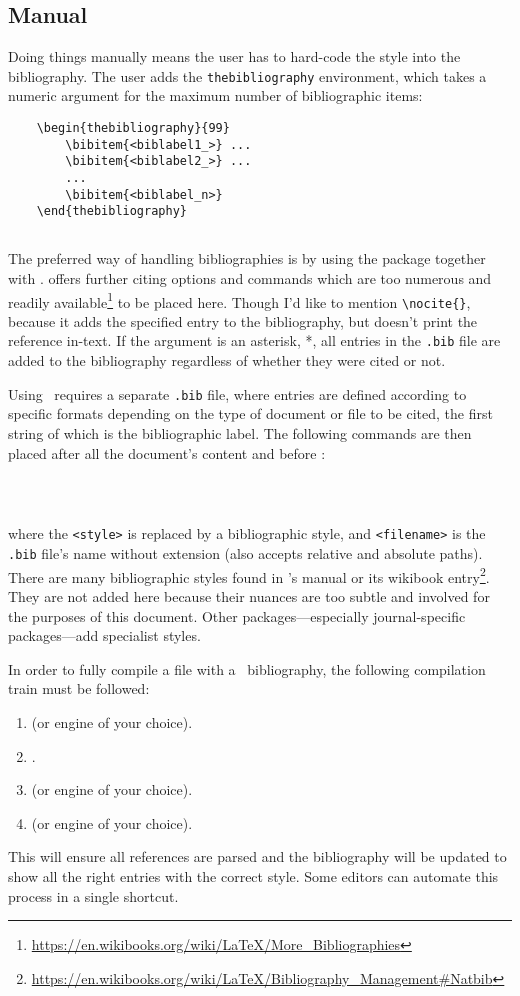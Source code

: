 \subsection{Manual}
%
Doing things manually means the user has to hard-code the style into
the bibliography.  The user adds the \verb|thebibliography|
environment, which takes a numeric argument for the maximum number of
bibliographic items:
\begin{verbatim}
	\begin{thebibliography}{99}
	    \bibitem{<biblabel1_>} ...
	    \bibitem{<biblabel2_>} ...
	    ...
	    \bibitem{<biblabel_n>}
	\end{thebibliography}
\end{verbatim}
%
\subsection{\BibTeX}\label{sb:bib}
%
The preferred way of handling bibliographies is by using the
 package together with \BibTeX.   offers
further citing options and commands which are too numerous and readily
available\footnote{\url{https://en.wikibooks.org/wiki/LaTeX/More_Bibliographies}}
to be placed here.  Though I'd like to mention \verb|\nocite{}|,
because it adds the specified entry to the bibliography, but doesn't
print the reference in-text.  If the argument is an asterisk, *, all
entries in the \verb|.bib| file are added to the bibliography
regardless of whether they were cited or not.

Using \BibTeX~requires a separate \verb|.bib| file, where entries are
defined according to specific formats depending on the type of
document or file to be cited, the first string of which is the
bibliographic label.  The following commands are then placed after all
the document's content and before \verb||:
\begin{verbatim}
	
	
\end{verbatim}
where the \verb|<style>| is replaced by a bibliographic style, and
\verb|<filename>| is the \verb|.bib| file's name without extension
(also accepts relative and absolute paths).  There are many
bibliographic styles found in 's manual or its wikibook
entry\footnote{\url{https://en.wikibooks.org/wiki/LaTeX/Bibliography_Management\#Natbib}}. They
are not added here because their nuances are too subtle and involved
for the purposes of this document.  Other packages---especially
journal-specific packages---add specialist styles.

In order to fully compile a file with a \BibTeX~bibliography, the
following compilation train must be followed:
\begin{enumerate}
\item \XeLaTeX (or engine of your choice).
\item \BibTeX.
\item \XeLaTeX (or engine of your choice).
\item \XeLaTeX (or engine of your choice).
\end{enumerate}
This will ensure all references are parsed and the bibliography will
be updated to show all the right entries with the correct style.  Some
editors can automate this process in a single shortcut.
%
